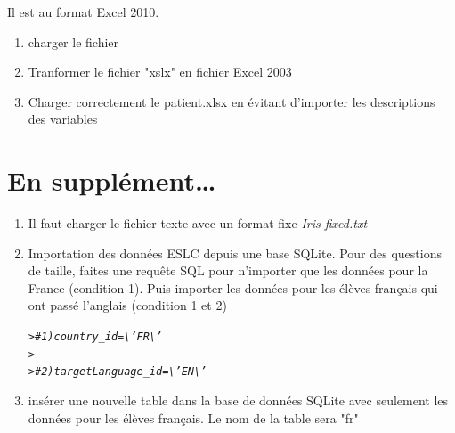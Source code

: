 \documentclass[a4paper,11pt,twoside]{article}\usepackage[]{graphicx}\usepackage[]{color}
\makeatletter
\newcommand{\hlcom}[1]{\textcolor[rgb]{0.678,0.584,0.686}{\textit{#1}}}%
\newcommand{\hlstd}[1]{\textcolor[rgb]{0.345,0.345,0.345}{#1}}%
\newenvironment{kframe}{%
 \def\at@end@of@kframe{}%
 \ifinner\ifhmode%
  \def\at@end@of@kframe{\end{minipage}}%
  \begin{minipage}{\columnwidth}%
 \fi\fi%
 \def\FrameCommand##1{\hskip\@totalleftmargin \hskip-\fboxsep
 \colorbox{shadecolor}{##1}\hskip-\fboxsep
     \hskip-\linewidth \hskip-\@totalleftmargin \hskip\columnwidth}%
 \MakeFramed {\advance\hsize-\width
   \@totalleftmargin\z@ \linewidth\hsize
   \@setminipage}}%
 {\par\unskip\endMakeFramed%
 \at@end@of@kframe}
\newenvironment{knitrout}{}{} %
\makeatother
\begin{document}
Il est au format Excel 2010.

\begin{enumerate}
  \item charger le fichier


  
  \item Tranformer le fichier "xslx" en fichier Excel 2003
  


  \item Charger correctement le patient.xlsx en évitant d'importer les descriptions des variables
  

  
  \end{enumerate}

\section{En supplément\dots}

\begin{enumerate}
  \item Il faut charger le fichier texte avec un format fixe \emph{Iris-fixed.txt}




  \item Importation des données ESLC depuis une base SQLite. Pour des questions de taille, faites une requête SQL pour n'importer que les données pour la France (condition 1). Puis importer les données pour les élèves français qui ont passé l'anglais (condition 1 et 2)
  
\begin{knitrout}\footnotesize
{}\color{fgcolor}\begin{kframe}
\begin{alltt}
\hlstd{> }\hlcom{# 1) country_id = \textbackslash{}'FR\textbackslash{}'}
\hlstd{> }
\hlstd{> }\hlcom{# 2) targetLanguage_id=\textbackslash{}'EN\textbackslash{}'}
\end{alltt}
\end{kframe}
\end{knitrout}
  


  \item insérer une nouvelle table dans la base de données SQLite avec seulement les données pour les élèves français. Le nom de la table sera "fr"



\end{enumerate}
\end{document}
